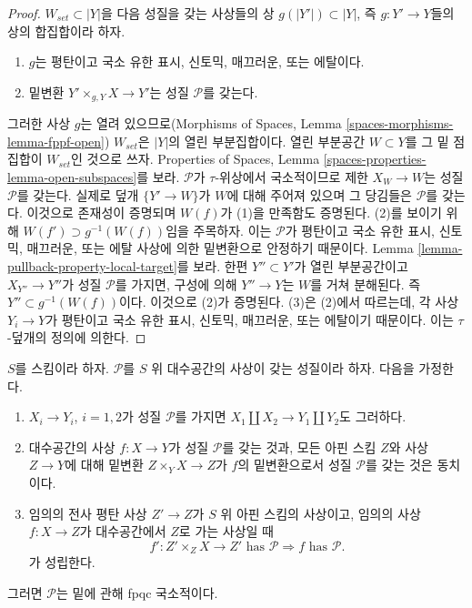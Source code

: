 \begin{proof}
$W_{set}\subset|Y|$을 다음 성질을 갖는 사상들의 상
$g(|Y'|)\subset|Y|$, 즉 $g:Y'\to Y$들의 상의 합집합이라 하자.
\begin{enumerate}
\item $g$는 평탄이고 국소 유한 표시, 신토믹, 매끄러운, 또는 에탈이다.
\item 밑변환 $Y'\times_{g,Y}X\to Y'$는 성질 $\mathcal{P}$를 갖는다.
\end{enumerate}
그러한 사상 $g$는 열려 있으므로(Morphisms of Spaces, Lemma
\ref{spaces-morphisms-lemma-fppf-open}) $W_{set}$은 $|Y|$의 열린
부분집합이다. 열린 부분공간 $W\subset Y$를 그 밑 점집합이
$W_{set}$인 것으로 쓰자.
Properties of Spaces, Lemma
\ref{spaces-properties-lemma-open-subspaces}를 보라. $\mathcal{P}$가
$\tau$-위상에서 국소적이므로 제한 $X_W\to W$는 성질 $\mathcal{P}$를
갖는다. 실제로 덮개 $\{Y'\to W\}$가 $W$에 대해 주어져 있으며 그 당김들은
$\mathcal{P}$를 갖는다. 이것으로 존재성이 증명되며 $W(f)$가 (1)을
만족함도 증명된다. (2)를 보이기 위해
$W(f')\supset g^{-1}(W(f))$임을 주목하자. 이는 $\mathcal{P}$가 평탄이고
국소 유한 표시, 신토믹, 매끄러운, 또는 에탈 사상에 의한 밑변환으로
안정하기 때문이다. Lemma
\ref{lemma-pullback-property-local-target}를 보라. 한편
$Y''\subset Y'$가 열린 부분공간이고 $X_{Y''}\to Y''$가 성질
$\mathcal{P}$를 가지면, 구성에 의해 $Y''\to Y$는 $W$를 거쳐
분해된다. 즉 $Y''\subset g^{-1}(W(f))$이다. 이것으로 (2)가 증명된다.
(3)은 (2)에서 따르는데, 각 사상 $Y_i\to Y$가 평탄이고 국소 유한 표시,
신토믹, 매끄러운, 또는 에탈이기 때문이다. 이는 $\tau$-덮개의 정의에
의한다.
\end{proof}

\begin{lemma}
\label{lemma-descending-properties-morphisms}
$S$를 스킴이라 하자. $\mathcal{P}$를 $S$ 위 대수공간의 사상이 갖는
성질이라 하자. 다음을 가정한다.
\begin{enumerate}
\item $X_i\to Y_i$, $i=1,2$가 성질 $\mathcal{P}$를 가지면
$X_1\amalg X_2\to Y_1\amalg Y_2$도 그러하다.
\item 대수공간의 사상 $f:X\to Y$가 성질 $\mathcal{P}$를 갖는 것과,
모든 아핀 스킴 $Z$와 사상 $Z\to Y$에 대해 밑변환
$Z\times_YX\to Z$가 $f$의 밑변환으로서 성질 $\mathcal{P}$를 갖는 것은
동치이다.
\item 임의의 전사 평탄 사상 $Z'\to Z$가 $S$ 위 아핀 스킴의 사상이고,
임의의 사상 $f:X\to Z$가 대수공간에서 $Z$로 가는 사상일 때
$$
f' : Z' \times_Z X \to Z'\text{ has }\mathcal{P}
\Rightarrow
f\text{ has }\mathcal{P}.
$$
가 성립한다.
\end{enumerate}
그러면 $\mathcal{P}$는 밑에 관해 fpqc 국소적이다.
\end{lemma}

